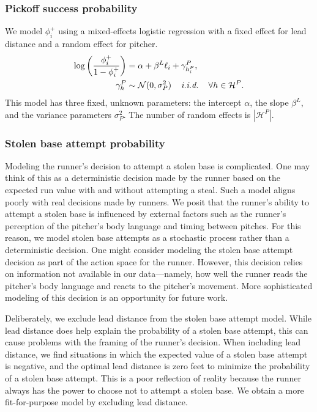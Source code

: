 \documentclass[11pt]{article}
\begin{document}
      \subsubsection{Pickoff success probability}
      \label{sec:prob-po-success}

        We model $\phi_i^+$ using a mixed-effects logistic regression with a fixed effect for lead distance and a random effect for pitcher.
        \begin{align}
          \label{eqn:prob-po-success}
          \begin{split}
            \log\left(\frac{\phi_i^+}{1 - \phi_i^+}\right) &= \alpha + \beta^L \ell_i + \gamma^P_{h_i^P},\\
            \gamma^P_{h} &\sim \mathcal{N}(0, \sigma^2_P) \hspace{4mm} \mbox{\it i.i.d.} \hspace{4mm} \forall h \in \mathcal{H}^P.
          \end{split}
        \end{align}
        This model has three fixed, unknown parameters: the intercept $\alpha$, the slope $\beta^L$, and the variance parameters $\sigma^2_P$. The number of random effects is $|\mathcal{H}^P|$.

      \subsubsection{Stolen base attempt probability}
      \label{sec:prob-sb-attempt}

        Modeling the runner's decision to attempt a stolen base is complicated. One may think of this as a deterministic decision made by the runner based on the expected run value with and without attempting a steal. Such a model aligns poorly with real decisions made by runners. We posit that the runner's ability to attempt a stolen base is influenced by external factors such as the runner's perception of the pitcher's body language and timing between pitches. For this reason, we model stolen base attempts as a stochastic process rather than a deterministic decision. One might consider modeling the stolen base attempt decision as part of the action space for the runner. However, this decision relies on information not available in our data---namely, how well the runner reads the pitcher's body language and reacts to the pitcher's movement. More sophisticated modeling of this decision is an opportunity for future work.

        Deliberately, we exclude lead distance from the stolen base attempt model. While lead distance does help explain the probability of a stolen base attempt, this can cause problems with the framing of the runner's decision. When including lead distance, we find situations in which the expected value of a stolen base attempt is negative, and the optimal lead distance is zero feet to minimize the probability of a stolen base attempt. This is a poor reflection of reality because the runner always has the power to choose not to attempt a stolen base. We obtain a more fit-for-purpose model by excluding lead distance.
\end{document}
